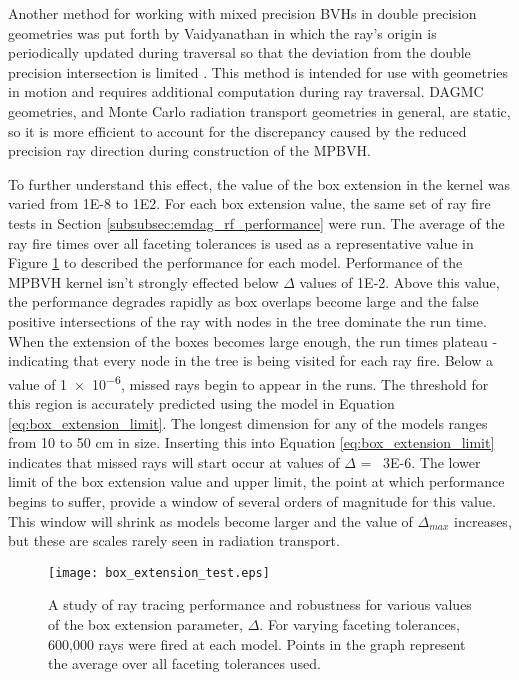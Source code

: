 Another method for working with mixed precision BVHs in double precision
geometries was put forth by Vaidyanathan in which the ray's origin is
periodically updated during traversal so that the deviation from the double
precision intersection is limited \cite{Vaidyanathan_2016}. This method is
intended for use with geometries in motion and requires additional computation
during ray traversal. DAGMC geometries, and Monte Carlo radiation transport
geometries in general, are static, so it is more efficient to account for the
discrepancy caused by the reduced precision ray direction during construction of
the MPBVH.

To further understand this effect, the value of the box extension in the kernel
was varied from \num{1E-8} to \num{1E2}. For each box extension value, the same
set of ray fire tests in Section \ref{subsubsec:emdag_rf_performance} were
run. The average of the ray fire times over all faceting tolerances is used as a
representative value in Figure \ref{fig:box_bump_tests} to described the
performance for each model. Performance of the MPBVH kernel isn't strongly
effected below $\Delta$ values of \num{1E-2}. Above this value, the performance
degrades rapidly as box overlaps become large and the false positive
intersections of the ray with nodes in the tree dominate the run time. When the
extension of the boxes becomes large enough, the run times plateau - indicating
that every node in the tree is being visited for each ray fire. Below a value of
\num{1e-6}, missed rays begin to appear in the runs. The threshold for this
region is accurately predicted using the model in Equation
\eqref{eq:box_extension_limit}. The longest dimension for any of the models ranges
from 10 to 50 cm in size. Inserting this into Equation
\eqref{eq:box_extension_limit} indicates that missed rays will start occur at
values of $\Delta$ = ~\num{3E-6}. The lower limit of the box extension value and
upper limit, the point at which performance begins to suffer, provide a window
of several orders of magnitude for this value. This window will shrink as models
become larger and the value of $\Delta_{max}$ increases, but these are scales
rarely seen in radiation transport.

\begin{figure}[H]
  \centering
  \texttt{[image: box\_extension\_test.eps]}
  \caption[Results of ray fire performance for various box extension values.]{A
    study of ray tracing performance and robustness for various values of the
    box extension parameter, $\Delta$. For varying faceting tolerances, 600,000
    rays were fired at each model. Points in the graph represent the average
    over all faceting tolerances used.}
  \label{fig:box_bump_tests}
\end{figure}

